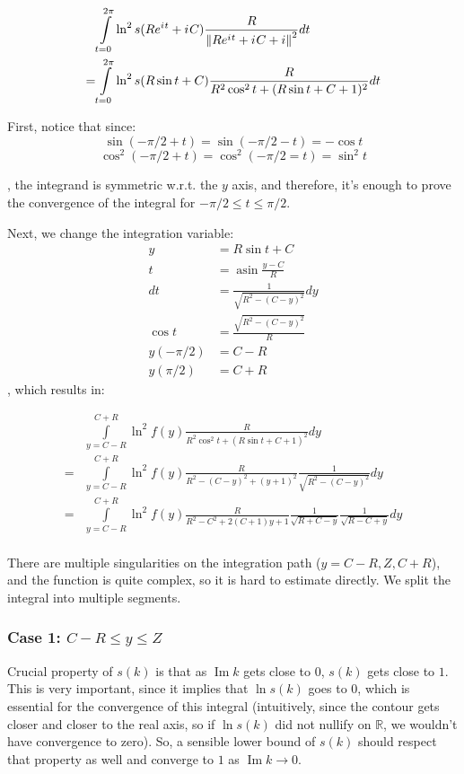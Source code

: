 \documentclass[12pt, a4paper]{article}
\newcommand{\norm}[1]{\left\lVert #1 \right\rVert}
\newcommand{\bbR}{\mathbb{R}}
\newcommand{\eexp}[1]{e^{#1}}
\newcommand{\iu}{{i\mkern1mu}}
\renewcommand{\Im}{\operatorname{Im}}
\DeclareMathOperator\asin{asin}
\begin{document}
\begin{align*}
    & \int\limits_{t = 0}^{2 \pi} \ln^2 s(R \eexp{\iu t} + \iu C) \frac{R}{\norm{R \eexp{\iu t} + \iu C + i}^2} dt\\
=   & \int\limits_{t = 0}^{2 \pi} \ln^2 s(R \sin t + C) \frac{R}{R^2 \cos^2 t + (R \sin t + C + 1)^2} dt
\end{align*}

First, notice that since:
\[
\sin(-\pi/2 + t) = \sin(-\pi/2 - t) = - \cos t
\]
\[
\cos^2(-\pi/2 + t) = \cos^2(-\pi/2 = t) = \sin^2 t
\]

, the integrand is symmetric w.r.t. the $y$ axis, and therefore, it's enough to prove the convergence of the integral for $-\pi/2 \le t \le \pi/2$.

Next, we change the integration variable:
\begin{align*}
   y         &= R \sin t + C
\\ t         &= \asin \frac{y - C}{R}
\\ dt        &= \frac{1}{\sqrt{R^2 - (C - y)^2}} dy
\\ \cos t    &= \frac{\sqrt{R^2 - (C - y)^2}}{R}
\\ y(-\pi/2) &= C - R 
\\ y(\pi/2)  &= C + R 
\end{align*}
, which results in:

\begin{align*}
    & \int\limits_{y = C - R}^{C + R} \ln^2 f(y) \frac{R}{R^2 \cos^2 t + (R \sin t + C + 1)^2} dy \\
=   & \int\limits_{y = C - R}^{C + R} \ln^2 f(y) \frac{R}{R^2 - (C - y)^2 + (y + 1)^2} \frac{1}{\sqrt{R^2 - (C - y)^2}} dy\\
=   & \int\limits_{y = C - R}^{C + R} \ln^2 f(y) \frac{R}{R^2 - C^2 + 2 (C + 1) y + 1} \frac{1}{\sqrt{R + C - y}} \frac{1}{\sqrt{R - C + y}}  dy\\
\end{align*}

There are multiple singularities on the integration path ($y = C - R, Z, C + R$), and the function is quite complex, so it is hard to estimate directly. We split the integral into multiple segments.

\subsubsection*{Case 1: $C - R \le y \le Z$}
Crucial property of $s(k)$ is that as $\Im k$ gets close to $0$, $s(k)$ gets close to $1$. This is very important, since it implies that $\ln s(k)$ goes to $0$, which is essential for the convergence of this integral (intuitively, since the contour gets closer and closer to the real axis, so if $\ln s(k)$ did not nullify on $\bbR$, we wouldn't have convergence to zero). So, a sensible lower bound of $s(k)$ should respect that property as well and converge to $1$ as $\Im k \to 0$.
\end{document}
